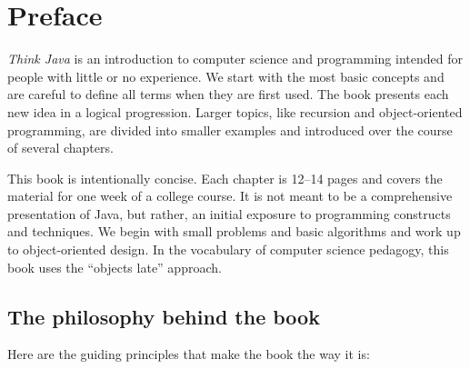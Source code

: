 \documentclass[12pt]{book}
\theoremstyle{exercise}
\begin{document}
\chapter*{Preface}

{\em Think Java} is an introduction to computer science and programming intended for people with little or no experience.
We start with the most basic concepts and are careful to define all terms when they are first used.
The book presents each new idea in a logical progression.
Larger topics, like recursion and object-oriented programming, are divided into smaller examples and introduced over the course of several chapters.


This book is intentionally concise.
Each chapter is 12--14 pages and covers the material for one week of a college course.
It is not meant to be a comprehensive presentation of Java, but rather, an initial exposure to programming constructs and techniques.
We begin with small problems and basic algorithms and work up to object-oriented design.
In the vocabulary of computer science pedagogy, this book uses the ``objects late'' approach.

\section*{The philosophy behind the book}

Here are the guiding principles that make the book the way it is:
\end{document}
